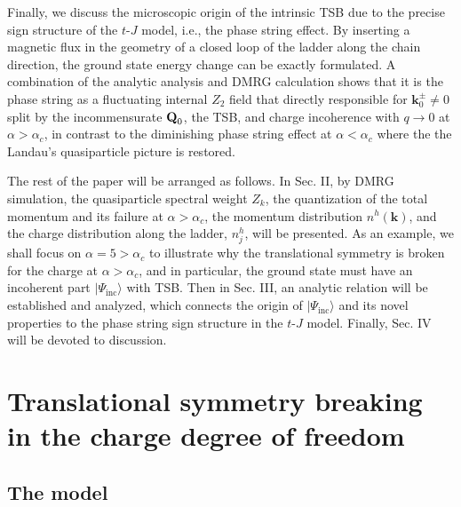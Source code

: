 \documentclass[aps,prb,twocolumn,notitlepage,superscriptaddress,showpacs]{revtex4-1}
\begin{document}
Finally, we discuss the microscopic origin of the intrinsic TSB  due to the precise sign structure of the $t$-$J$ model, i.e., the phase string effect. By inserting a magnetic flux in the geometry of a closed loop of the ladder along the chain direction,  the ground state energy change can be exactly formulated. A combination of the analytic analysis and DMRG calculation shows that it is the phase string as a fluctuating internal $Z_2$ field that directly responsible for ${\textbf{k}}_0^{\pm}\neq 0$ split by the incommensurate ${\textbf Q}_0$, the TSB, and charge incoherence with $q\rightarrow 0$ at $\alpha>\alpha_c$, in contrast to the diminishing phase string effect at  $\alpha<\alpha_c$ where the  the Landau's quasiparticle picture is restored.

The rest of the  paper will be arranged as follows. In Sec. II, by DMRG simulation, the quasiparticle spectral weight $Z_k$, the quantization of the total momentum and its failure at $\alpha>\alpha_c$, the momentum distribution $n^h({\textbf{k}})$, and the charge distribution along the ladder, $n^h_j$, will be presented. As an example, we shall focus on $\alpha=5>\alpha_c$ to illustrate why the translational symmetry is broken for the charge at $\alpha>\alpha_c$, and in particular, the ground state must have an incoherent part  $|\Psi_{\mathrm {inc}}\rangle $ with TSB. Then in Sec. III,
an analytic relation will be established and analyzed, which connects the origin of  $|\Psi_{\mathrm {inc}}\rangle $ and its novel properties to the phase string sign structure in the $t$-$J$ model. Finally, Sec. IV will be devoted to discussion.


\section{Translational symmetry breaking in the charge degree of freedom}


\subsection{The model }
\end{document}

